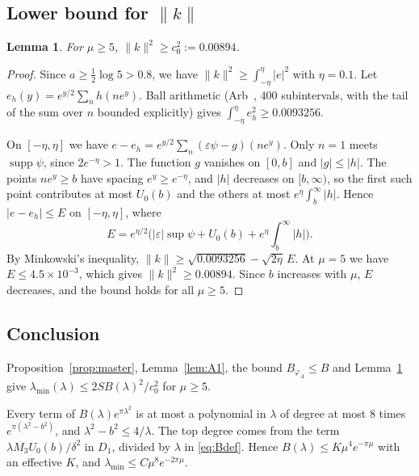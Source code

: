 \documentclass[11pt]{amsart}
\newtheorem{lemma}[proposition]{Lemma}
\theoremstyle{definition}
\theoremstyle{remark}
\numberwithin{equation}{section}
\begin{document}
\subsection{Lower bound for \texorpdfstring{$\|k\|$}{||k||}}
\begin{lemma}\label{lem:A3}
For $\mu\ge5$, $\|k\|^2\ge c_0^2:=0.00894$.
\end{lemma}
\begin{proof}
Since $a\ge\frac12\log5>0.8$, we have $\|k\|^2\ge\int_{-\eta}^{\eta}|e|^2$ with $\eta=0.1$. Let $e_h(y)=e^{y/2}\sum_nh(ne^y)$. Ball arithmetic (Arb~\cite{Arb}, $400$ subintervals, with the tail of the sum over $n$ bounded explicitly) gives $\int_{-\eta}^\eta e_h^2\ge0.0093256$.

On $[-\eta,\eta]$ we have $e-e_h=e^{y/2}\sum_n(\varepsilon\psi-g)(ne^y)$. Only $n=1$ meets $\operatorname{supp}\psi$, since $2e^{-\eta}>1$. The function $g$ vanishes on $[0,b]$ and $|g|\le|h|$. The points $ne^y\ge b$ have spacing $e^y\ge e^{-\eta}$, and $|h|$ decreases on $[b,\infty)$, so the first such point contributes at most $U_0(b)$ and the others at most $e^{\eta}\int_b^\infty|h|$. Hence $|e-e_h|\le E$ on $[-\eta,\eta]$, where
\[
E=e^{\eta/2}\Big(|\varepsilon|\sup\psi+U_0(b)+e^{\eta}\int_b^\infty|h|\Big).
\]
By Minkowski's inequality, $\|k\|\ge\sqrt{0.0093256}-\sqrt{2\eta}\,E$. At $\mu=5$ we have $E\le4.5\times10^{-3}$, which gives $\|k\|^2\ge0.00894$. Since $b$ increases with $\mu$, $E$ decreases, and the bound holds for all $\mu\ge5$.
\end{proof}

\subsection{Conclusion}
Proposition~\ref{prop:master}, Lemma~\ref{lem:A1}, the bound $B_{\varphi_A}\le B$ and Lemma~\ref{lem:A3} give $\lambda_{\min}(\lambda)\le2SB(\lambda)^2/c_0^2$ for $\mu\ge5$.

Every term of $B(\lambda)e^{\pi\lambda^2}$ is at most a polynomial in $\lambda$ of degree at most $8$ times $e^{\pi(\lambda^2-b^2)}$, and $\lambda^2-b^2\le4/\lambda$. The top degree comes from the term $\lambda M_3U_0(b)/\delta^2$ in $D_1$, divided by $\lambda$ in \eqref{eq:Bdef}. Hence $B(\lambda)\le K\mu^4e^{-\pi\mu}$ with an effective $K$, and $\lambda_{\min}\le C\mu^8e^{-2\pi\mu}$.
\end{document}
